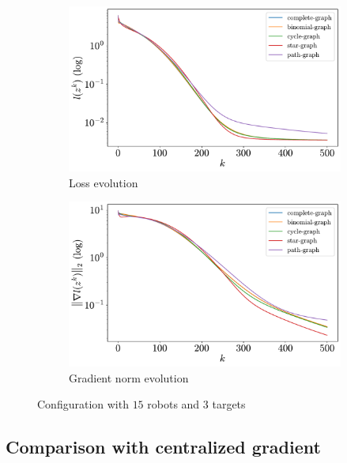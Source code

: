 \documentclass[a4paper,11pt,oneside]{book}
\begin{document}
\begin{figure}[H]
      \centering
      \begin{subfigure}[t]{0.49\textwidth}
            \centering
            \includegraphics[width=\linewidth]{./figs/tracking/loss_15_3_2_500.pdf} 
            \caption{Loss evolution}
      \end{subfigure}
      \hfill
      \begin{subfigure}[t]{0.49\textwidth}
            \centering
            \includegraphics[width=\linewidth]{./figs/tracking/gradient_15_3_2_500.pdf} 
            \caption{Gradient norm evolution}
      \end{subfigure}
      \caption{Configuration with $15$ robots and $3$ targets}
\end{figure}



\subsection{Comparison with centralized gradient}
\end{document}
